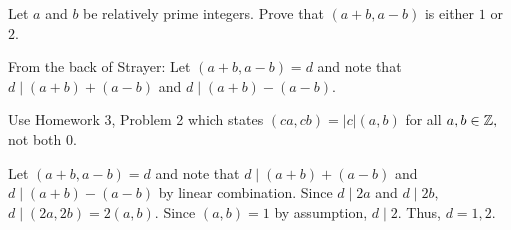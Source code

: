 \documentclass[handout,hints]{ximera}
\begin{document}
\begin{br}
    Let $a$ and $b$ be relatively prime integers. Prove that $(a+b,a-b)$ is either $1$ or $2$.
	
    
    \begin{hint}
        From the back of Strayer: Let $(a+b,a-b)=d$ and note that $d\mid(a+b)+(a-b)$ and $d\mid (a +b) - (a - b).$
    \end{hint}
    \begin{hint}
        Use Homework 3, Problem 2 which states $(ca,cb)=|c|(a,b)$ for all $a,b\in\mathbb Z,$ not both $0.$
    \end{hint}

    \begin{solution}
        Let $(a+b,a-b)=d$ and note that $d\mid (a+b)+(a-b)$ and $d\mid (a+b)-(a-b)$ by linear combination.
        Since $d\mid 2a$ and $d\mid 2b,$  $d\mid(2a,2b)=2(a,b).$ Since $(a,b)=1$ by assumption, $d\mid 2.$ Thus, $d=1,2.$
    \end{solution}
    \pdfOnly{\ifhandout{
            \vfill
            \vfill}
            \else
            \fi}
\end{br}
\end{document}
